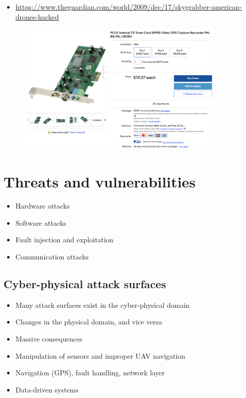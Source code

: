 \begin{frame}{\insertsection}
    \begin{itemize}
        \item \url{https://www.theguardian.com/world/2009/dec/17/skygrabber-american-drones-hacked}
    \end{itemize}
    
    \begin{figure}[h]
        \centering
        \includegraphics[width=10cm]{img/kort.png}
        \label{fig:iran}
    \end{figure}
\end{frame}

\section{Threats and vulnerabilities}
\begin{frame}{\insertsection}
    \begin{itemize}
        \item Hardware attacks
        \item Software attacks
        \item Fault injection and exploitation
        \item Communication attacks
    \end{itemize}
\end{frame}

\subsection{Cyber-physical attack surfaces}
\begin{frame}{\insertsubsection}
    \begin{itemize}
        \item Many attack surfaces exist in the cyber-physical domain
        \item Changes in the physical domain, and vice versa
        \item Massive consequences
        \item Manipulation of sensors and improper UAV navigation
        \vspace{0.5cm}
        \item Navigation (GPS), fault handling, network layer
        \item Data-driven systems
    \end{itemize}
\end{frame}

